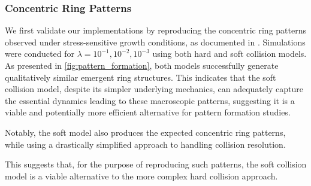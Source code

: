 \documentclass[conference]{IEEEtran}
\newlength{\subfigwidth}
\newcommand{\growthcomparisonrow}[6]{%
    #1 &
    \begin{subfigure}[b]{\subfigwidth}
        \texttt{[image: figures/growth\_comparison\_lambda\_\#2/\#1.\#3.png]}
    \end{subfigure} &
    \begin{subfigure}[b]{\subfigwidth}
        \texttt{[image: figures/growth\_comparison\_lambda\_\#2/\#1.\#4.png]}
    \end{subfigure} &
    \begin{subfigure}[b]{\subfigwidth}
        \texttt{[image: figures/growth\_comparison\_lambda\_\#2/\#1.\#5.png]}
    \end{subfigure} &
    \begin{subfigure}[b]{\subfigwidth}
        \texttt{[image: figures/growth\_comparison\_lambda\_\#2/\#1.\#6.png]}
    \end{subfigure}  \\
}
\begin{document}
\subsubsection{Concentric Ring Patterns}

We first validate our implementations by reproducing the concentric ring patterns observed under stress-sensitive growth conditions, as documented in \cite{Weady2024}. Simulations were conducted for $\lambda = 10^{-1}, 10^{-2}, 10^{-3}$ using both hard and soft collision models. As presented in \autoref{fig:pattern_formation}, both models successfully generate qualitatively similar emergent ring structures. This indicates that the soft collision model, despite its simpler underlying mechanics, can adequately capture the essential dynamics leading to these macroscopic patterns, suggesting it is a viable and potentially more efficient alternative for pattern formation studies.


Notably, the soft model also produces the expected concentric ring patterns, while using a drastically simplified approach to handling collision resolution.

This suggests that, for the purpose of reproducing such patterns, the soft collision model is a viable alternative to the more complex hard collision approach.



\end{document}
